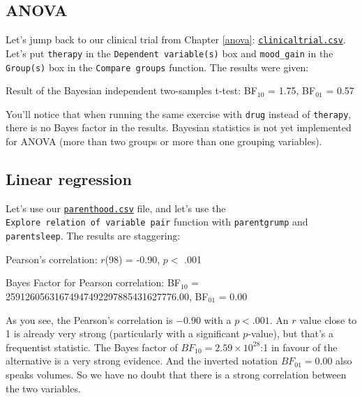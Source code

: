 \documentclass[
]{book}
\theoremstyle{definition}
\theoremstyle{definition}
\theoremstyle{definition}
\theoremstyle{definition}
\theoremstyle{remark}
\begin{document}
\hypertarget{anova-1}{%
\subsection{ANOVA}\label{anova-1}}

Let's jump back to our clinical trial from Chapter \ref{anova}: \href{resources/data/clinicaltrial.csv}{\texttt{clinicaltrial.csv}}. Let's put \texttt{therapy} in the \texttt{Dependent\ variable(s)} box and \texttt{mood\_gain} in the \texttt{Group(s)} box in the \texttt{Compare\ groups} function. The results were given:

\begin{tcolorbox}[colback=white,
  colframe=lightgray,
  coltext=black,
  boxsep=4pt,
  boxrule=0.3pt,
  arc=0pt]
  {   \sffamily
      \color{black}
      Result of the Bayesian independent two-samples t-test: BF$_{10}$ = 1.75, BF$_{01}$ = 0.57

      \normalfont
  }
\end{tcolorbox}

You'll notice that when running the same exercise with \texttt{drug} instead of \texttt{therapy}, there is no Bayes factor in the results. Bayesian statistics is not yet implemented for ANOVA (more than two groups or more than one grouping variables).

\hypertarget{linear-regression}{%
\subsection{Linear regression}\label{linear-regression}}

Let's use our \href{resources/data/parenthood.csv}{\texttt{parenthood.csv}} file, and let's use the \texttt{Explore\ relation\ of\ variable\ pair} function with \texttt{parentgrump} and \texttt{parentsleep}. The results are staggering:

\begin{tcolorbox}[colback=white,
  colframe=lightgray,
  coltext=black,
  boxsep=4pt,
  boxrule=0.3pt,
  arc=0pt]
  {   \sffamily
      \color{black}
      Pearson's correlation: $r$(98) = -0.90, $p <$ .001

      Bayes Factor for Pearson correlation: BF$_{10}$ = 25912605631674947492297885431627776.00, BF$_{01}$ = 0.00

      \normalfont
  }
\end{tcolorbox}

As you see, the Pearson's correlation is \(-0.90\) with a \(p < .001\). An \(r\) value close to 1 is already very strong (particularly with a significant \(p\)-value), but that's a frequentist statistic. The Bayes factor of \(BF_{10} = 2.59 \times 10^{28}\):1 in favour of the alternative is a very strong evidence. And the inverted notation \(BF_{01} = 0.00\) also speaks volumes. So we have no doubt that there is a strong correlation between the two variables.
\end{document}
